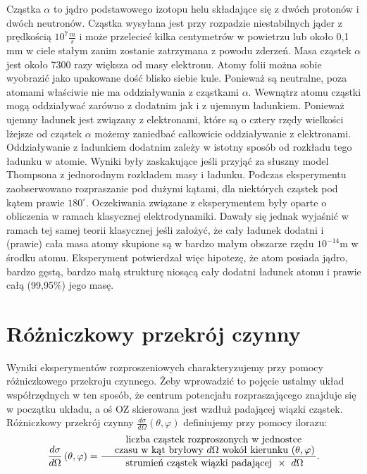\documentclass[11pt]{book}
\theoremstyle{definition}
\begin{document}
Cząstka $\alpha$ to jądro podstawowego izotopu helu składające się z dwóch protonów i dwóch neutronów. Cząstka wysyłana jest przy rozpadzie niestabilnych jąder z prędkością $10^7 \frac{\si{m}}{\si{s}}$ i może przelecieć kilka centymetrów w powietrzu lub około 0,1 mm w ciele stałym zanim zostanie zatrzymana z powodu zderzeń. Masa cząstek $\alpha$ jest około 7300 razy większa od masy elektronu. Atomy folii można sobie wyobrazić jako upakowane dość blisko siebie kule. Ponieważ są neutralne, poza atomami właściwie nie ma oddziaływania z cząstkami $\alpha$. Wewnątrz atomu cząstki mogą oddziaływać zarówno z dodatnim jak i z ujemnym ładunkiem. Ponieważ ujemny ładunek jest
związany z elektronami, które są o cztery rzędy wielkości lżejsze od cząstek $\alpha$ możemy zaniedbać całkowicie oddziaływanie z elektronami. Oddziaływanie z ładunkiem dodatnim zależy w istotny sposób od rozkładu tego ładunku w atomie. 
Wyniki były zaskakujące jeśli przyjąć za słuszny model Thompsona z jednorodnym rozkładem masy i ładunku.  Podczas eksperymentu zaobserwowano rozpraszanie pod dużymi kątami, dla niektórych cząstek pod kątem prawie $180^{\circ}$. Oczekiwania związane z eksperymentem były oparte o obliczenia w ramach klasycznej elektrodynamiki. Dawały się jednak wyjaśnić w ramach tej samej teorii klasycznej jeśli założyć, że cały ładunek dodatni i (prawie) cała masa atomy skupione są w bardzo małym obszarze rzędu $10^{-14}$m w środku atomu. Eksperyment potwierdzał więc hipotezę, że atom posiada jądro, bardzo gęstą, bardzo małą strukturę niosącą cały dodatni ładunek atomu i prawie całą (99,95\%) jego masę.
%

\section{Różniczkowy przekrój czynny}

Wyniki eksperymentów rozproszeniowych charakteryzujemy przy pomocy różniczkowego przekroju czynnego. Żeby wprowadzić to pojęcie ustalmy układ współrzędnych w ten sposób, że centrum potencjału rozpraszającego znajduje się w początku układu, a oś OZ skierowana jest wzdłuż padającej wiązki cząstek. Różniczkowy przekrój czynny $\frac{d\sigma}{d\Omega}\left(\theta, \varphi\right)$ definiujemy przy pomocy ilorazu:
\begin{equation}
\frac{d\sigma}{d\Omega}\left(\theta, \varphi\right) = \frac{\splitfrac{\text{ \;\;\;\;\;\; liczba cząstek rozproszonych w jednostce }}{\text {czasu w kąt bryłowy $d\Omega$ wokół kierunku $\left(\theta, \varphi\right)$}}}{\text{\;\;\; strumień cząstek wiązki padającej $\; \times \; \; d\Omega$}}.
\end{equation}
\end{document}

